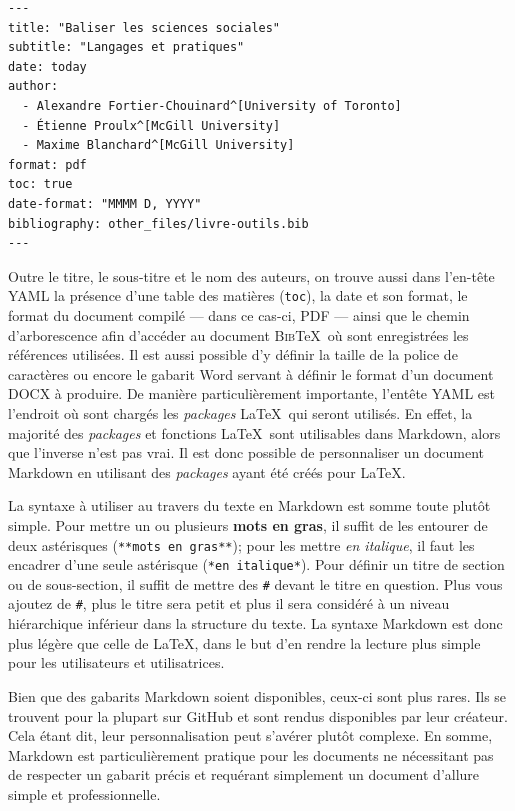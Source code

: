 \documentclass[
  letterpaper,
  DIV=11,
  numbers=noendperiod]{scrreprt}
\begin{document}
\begin{verbatim}
---
title: "Baliser les sciences sociales"
subtitle: "Langages et pratiques"
date: today
author:
  - Alexandre Fortier-Chouinard^[University of Toronto]
  - Étienne Proulx^[McGill University]
  - Maxime Blanchard^[McGill University]
format: pdf
toc: true
date-format: "MMMM D, YYYY"
bibliography: other_files/livre-outils.bib
---
\end{verbatim}

Outre le titre, le sous-titre et le nom des auteurs, on trouve aussi
dans l'en-tête YAML la présence d'une table des matières (\texttt{toc}),
la date et son format, le format du document compilé --- dans ce cas-ci,
PDF --- ainsi que le chemin d'arborescence afin d'accéder au document
\textsc{Bib}\TeX~où sont enregistrées les références utilisées. Il est
aussi possible d'y définir la taille de la police de caractères ou
encore le gabarit Word servant à définir le format d'un document DOCX à
produire. De manière particulièrement importante, l'entête YAML est
l'endroit où sont chargés les \emph{packages} \LaTeX~qui seront
utilisés. En effet, la majorité des \emph{packages} et fonctions
\LaTeX~sont utilisables dans Markdown, alors que l'inverse n'est pas
vrai. Il est donc possible de personnaliser un document Markdown en
utilisant des \emph{packages} ayant été créés pour \LaTeX.

La syntaxe à utiliser au travers du texte en Markdown est somme toute
plutôt simple. Pour mettre un ou plusieurs \textbf{mots en gras}, il
suffit de les entourer de deux astérisques
(\texttt{**mots\ en\ gras**}); pour les mettre \emph{en italique}, il
faut les encadrer d'une seule astérisque (\texttt{*en\ italique*}). Pour
définir un titre de section ou de sous-section, il suffit de mettre des
\texttt{\#} devant le titre en question. Plus vous ajoutez de
\texttt{\#}, plus le titre sera petit et plus il sera considéré à un
niveau hiérarchique inférieur dans la structure du texte. La syntaxe
Markdown est donc plus légère que celle de \LaTeX, dans le but d'en
rendre la lecture plus simple pour les utilisateurs et utilisatrices.

Bien que des gabarits Markdown soient disponibles, ceux-ci sont plus
rares. Ils se trouvent pour la plupart sur GitHub et sont rendus
disponibles par leur créateur. Cela étant dit, leur personnalisation
peut s'avérer plutôt complexe. En somme, Markdown est particulièrement
pratique pour les documents ne nécessitant pas de respecter un gabarit
précis et requérant simplement un document d'allure simple et
professionnelle.
\end{document}
